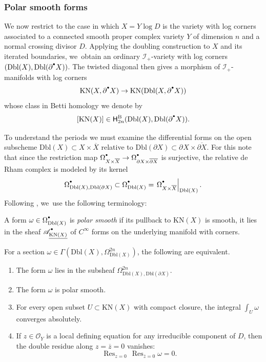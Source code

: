 \documentclass[JEP,XML,SOM,Unicode,NoFloatCountersInSection,published]{cedram}
\let\oldbullet\bullet
\renewcommand{\bullet}{{\raisebox{1pt}{$\scriptscriptstyle\oldbullet$}}}
\theoremstyle{definition}
\theoremstyle{remark}
\let\defn\emph
\newcommand{\zb}{\overline{z}}
\newcommand{\rbrac}[1]{\left(#1\right)}
\newcommand{\cO}[1]{\mathcal{O}_{#1}}
\newcommand{\cA}[2][\bullet]{\mathscr{A}^{#1}_{#2}}\newcommand{\A}[2][\bullet] {\mathscr{A}^{#1}\rbrac{#2}}
\DeclareMathOperator*{\res}{Res}
\newcommand{\cbdX}{\overline{\partial X}}
\newcommand{\bdX}[1][]{\partial^{#1} X}
\newcommand{\cX}{\overline{X}}
\newcommand{\KN}[1]{\mathrm{KN}(#1)}
\newcommand{\Dbl}[1]{\mathrm{Dbl}(#1)}
\newcommand{\sect}[1]{\mathsf{\Gamma}(#1)}
\newcommand{\HlgyB}[2][\bullet]{\mathsf{H}^{\mathrm{B}}_{#1}(#2)}
\newcommand{\forms}[2][\bullet]{\Omega^{#1}_{#2}}
\newcommand{\ascat}{\mathscr{I}_+}
\begin{document}
\subsubsection{Polar smooth forms}
We now restrict to the case in which $X = Y \log D$ is the variety with log corners associated to a connected smooth proper complex variety $Y$ of dimension $n$ and a normal crossing divisor $D$. Applying the doubling construction to $X$ and its iterated boundaries, we~obtain an ordinary $\ascat$-variety with log corners $(\Dbl{X},\Dbl{\partial^\bullet X})$. The twisted diagonal then gives a morphism of $\ascat$-manifolds with log corners
\[
\KN{X,\bdX[\bullet]} \to \KN{\Dbl{X,\bdX[\bullet]}}
\]
whose class in Betti homology we denote by
\[
[\KN{X}] \in \HlgyB[2n]{\Dbl{X},\Dbl{\partial^\bullet X}}.
\]

To understand the periods we must examine the differential forms on the open subscheme $\Dbl{X} \subset X\times\overline{X}$ relative to $\Dbl{\partial X} \subset \bdX\times\cbdX$. For this note that since the restriction map $\forms{X\times \cX} \to \forms{\partial X \times \overline{\partial X}}$ is surjective, the relative de Rham complex is modeled by its kernel
\[
\forms{\Dbl{X},\Dbl{\bdX}} \subset \forms{\Dbl{X}} = \left.\forms{X\times\cX}\right|_{\Dbl{X}}.
\]
Following \cite{BrownDupont}, we~use the following terminology:
\begin{definition}A form $\omega \in \forms{\Dbl{X}}$ is \defn{polar smooth} if its pullback to $\KN{X}$ is smooth, \ie it lies in the sheaf $\cA{\underline{\KN{X}}}$ of $C^\infty$ forms on the underlying manifold with corners.
\end{definition}

\begin{lemma}\label{lem:equiv}
For a section $\omega \in \sect{\Dbl{X},\forms[2n]{\Dbl{X}}}$, the following are equivalent.
\begin{enumerate}
\item\label{lem:equiv1}
The form $\omega$ lies in the subsheaf $\forms[2n]{\Dbl{X},\Dbl{\bdX}}$.
\item\label{lem:equiv2}
The form $\omega$ is polar smooth.
\item\label{lem:equiv3}
For every open subset $U \subset \KN{X}$ with compact closure, the integral $\int_U\omega$ converges absolutely.
\item\label{lem:equiv4}
If $z \in \cO{Y}$ is a local defining equation for any irreducible component of $D$, then the double residue along $z=\zb=0$ vanishes:
\[
\res_{z=0}\,\res_{\zb=0}\omega = 0.
\]
\end{enumerate}
\end{lemma}
\end{document}
